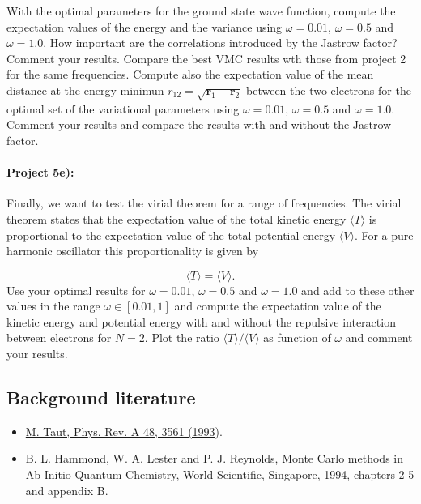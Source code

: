 \documentclass[%
oneside,                 %
final,                   %
10pt]{article}
\begin{document}
With the optimal parameters for the ground state wave function, compute the expectation values of the  energy and the variance using $\omega=0.01$,
  $\omega=0.5$ and $\omega=1.0$. How important are the correlations introduced by the Jastrow factor? Comment your results. Compare the best VMC results wth those from project 2 for the same frequencies.  Compute also the expectation value of the mean distance at the energy minimun 
  $r_{12}=\sqrt{\mathbf{r}_1-\mathbf{r}_2}$ between the two electrons for the optimal set of the variational parameters using $\omega=0.01$,
  $\omega=0.5$ and $\omega=1.0$.  Comment your results and compare the results with and without the Jastrow factor.

\paragraph{Project 5e):}
Finally, we want to test the virial theorem for a range of frequencies. The virial theorem states that the expectation value of the total kinetic energy $\langle T \rangle$ is proportional to the expectation value of the total potential energy $\langle V \rangle$. For a pure harmonic oscillator this proportionality is given by

\begin{equation*}
  \langle T \rangle= \langle V \rangle.
  \end{equation*}
  Use your optimal results for $\omega=0.01$,
  $\omega=0.5$ and $\omega=1.0$ and add to these other values in the range  $\omega\in [0.01,1]$
  and   compute the expectation value of the kinetic energy and potential energy with and without the
  repulsive interaction between electrons for $N=2$. Plot the
  ratio $\langle T \rangle/\langle V \rangle$ as function of
  $\omega$ and comment your results.

\subsection*{Background literature}

\begin{itemize}
   \item \href{{http://journals.aps.org/pra/abstract/10.1103/PhysRevA.48.3561}}{M. Taut, Phys. Rev. A 48, 3561 (1993)}.

   \item B. L. Hammond, W. A. Lester and P. J. Reynolds, Monte Carlo methods   in Ab Initio Quantum Chemistry, World Scientific, Singapore, 1994, chapters   2-5 and appendix B.
\end{itemize}
\end{document}
